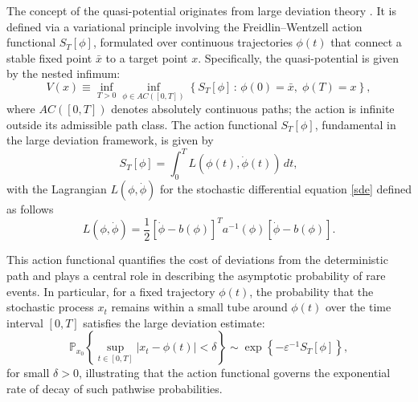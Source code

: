 \documentclass[11pt]{article}
\theoremstyle{plain}      %
\theoremstyle{definition} %
\begin{document}
The concept of the quasi-potential originates from large deviation theory \cite{Freidlin2012}. It is defined via a variational principle involving the Freidlin--Wentzell action functional \( S_T[\phi] \), formulated over continuous trajectories \( \phi(t) \) that connect a stable fixed point \( \bar{x} \) to a target point \( x \). Specifically, the quasi-potential is given by the nested infimum:
\begin{equation}
\label{quasip}
V(x) \equiv \inf_{T > 0} \inf_{\phi \in AC([0, T])} \left\{ S_T[\phi] \,:\, \phi(0) = \bar{x},\; \phi(T) = x \right\},
\end{equation}
where \(AC([0,T])\) denotes absolutely continuous paths; the action is infinite outside its admissible path class. The action functional \( S_T[\phi] \), fundamental in the large deviation framework, is given by
\begin{equation}
\label{actionf}
S_T[\phi] = \int_0^T L(\phi(t), \dot{\phi}(t))\,dt,
\end{equation}
with the Lagrangian \( L(\phi, \dot{\phi}) \) for the stochastic differential equation \eqref{sde} defined as follows
\begin{equation}
\label{Lagran}
L(\phi, \dot{\phi}) = \frac{1}{2} \left[ \dot{\phi} - b(\phi) \right]^{\!\!T} a^{-1}(\phi) \left[ \dot{\phi} - b(\phi) \right].
\end{equation}

This action functional quantifies the cost of deviations from the deterministic path and plays a central role in describing the asymptotic probability of rare events. In particular, for a fixed trajectory \( \phi(t) \), the probability that the stochastic process \( x_t \) remains within a small tube around \( \phi(t) \) over the time interval \([0, T]\) satisfies the large deviation estimate:
\begin{equation}
\label{LDP}
\mathbb{P}_{x_0} \left\{ \sup_{t \in [0, T]} \left| x_t - \phi(t) \right| < \delta \right\} \sim \exp\left\{ -\varepsilon^{-1} S_T[\phi] \right\},
\end{equation}
for small \( \delta > 0 \), illustrating that the action functional governs the exponential rate of decay of such pathwise probabilities.
\end{document}
